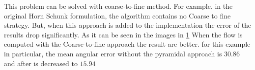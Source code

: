 \documentclass[12pt,a4paper,twoside]{report}
\begin{document}
This problem can be solved with coarse-to-fine method.
For example, in the original Horn Schunk formulation, the algorithm contains no Coarse to fine strategy. But, when this approach is added to the implementation the error of the results drop significantly. As it can be seen in the images in \ref{HSExample} When the flow is computed with the Coarse-to-fine approach the result are better. for this example in particular, the mean angular error without the pyramidal approach is $30.86$ and after is decreased to $15.94$





\begin{figure} \label{HSExample}
	\\

\end{figure}
\end{document}
